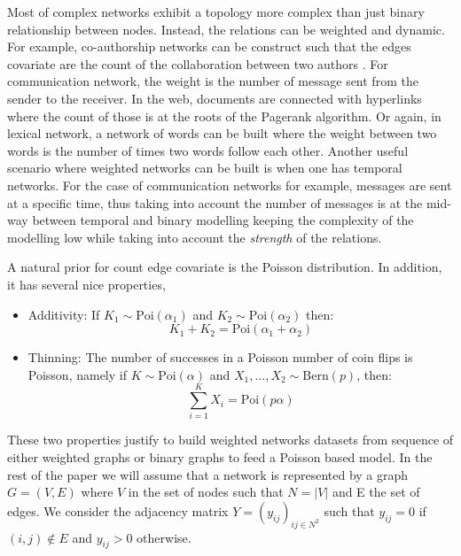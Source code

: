 Most of complex networks exhibit a topology more complex than just binary relationship between nodes. Instead, the relations can be weighted and dynamic. For example, co-authorship networks can be construct such that the edges covariate are the count of the collaboration between two authors \cite{newman2001scientific}. For communication network, the weight is the number of message sent from the sender to the receiver. In the web, documents are connected with hyperlinks where the count of those is at the roots of the Pagerank algorithm. Or again, in lexical network, a network of words can be built where the weight between two words is the number of times two words follow each other. Another useful scenario where weighted networks can be built is when one has temporal networks. For the case of communication networks for example, messages are sent at a specific time, thus taking into account the number of messages is at the mid-way between temporal and binary modelling keeping the complexity of the modelling low while taking into account the \emph{strength} of the relations.


A natural prior for count edge covariate is the Poisson distribution. In addition, it has several nice properties,

\begin{itemize}
\item{Additivity}: If $K_1 \sim \mathrm{Poi}(\alpha_1)$ and $K_2 \sim \mathrm{Poi}(\alpha_2)$ then:
    \begin{equation*}
        K_1 + K_2 = \mathrm{Poi}(\alpha_1 + \alpha_2)
    \end{equation*}
\item {Thinning}: The number of successes in a Poisson number of coin flips is Poisson, namely if $K \sim \mathrm{Poi}(\alpha)$ and $X_1,...,X_2 \sim \mathrm{Bern}(p)$, then:
    \begin{equation*}
        \sum_{i=1}^K X_i = \mathrm{Poi}(p\alpha)
    \end{equation*}
\end{itemize}

These two properties justify to build weighted networks datasets from sequence of either weighted graphs or binary graphs to feed a Poisson based model. In the rest of the paper we will assume that a network is represented by a graph $G=(V,E)$ where $V$ in the set of nodes such that $N=|V|$ and E the set of edges. We consider the adjacency matrix $Y=(y_{ij})_{ij\in N^2}$ such that $y_{ij}=0$ if $(i,j) \notin E$ and $y_{ij} > 0$ otherwise.

